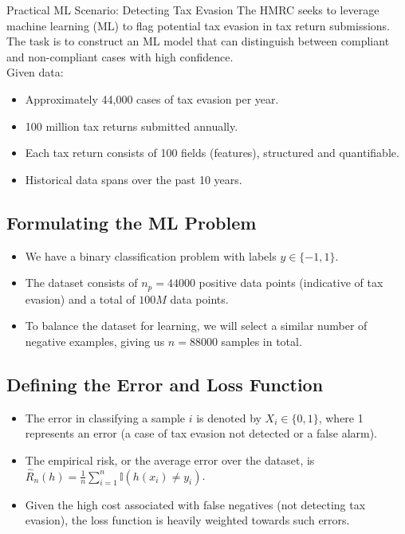 \begin{examplebox}{Practical ML Scenario: Detecting Tax Evasion}
    The HMRC seeks to leverage machine learning (ML) to flag potential tax evasion in tax return submissions. The task is to construct an ML model that can distinguish between compliant and non-compliant cases with high confidence.\\

Given data:
\begin{itemize}
    \item Approximately 44,000 cases of tax evasion per year.
    \item 100 million tax returns submitted annually.
    \item Each tax return consists of 100 fields (features), structured and quantifiable.
    \item Historical data spans over the past 10 years.
\end{itemize}

\subsection*{Formulating the ML Problem}
\begin{itemize}
    \item We have a binary classification problem with labels $y \in \{-1,1\}$.
    \item The dataset consists of $n_p = 44000$ positive data points (indicative of tax evasion) and a total of $100M$ data points.
    \item To balance the dataset for learning, we will select a similar number of negative examples, giving us $n = 88000$ samples in total.
\end{itemize}

\subsection*{Defining the Error and Loss Function}
\begin{itemize}
    \item The error in classifying a sample $i$ is denoted by $X_i \in \{0,1\}$, where 1 represents an error (a case of tax evasion not detected or a false alarm).
    \item The empirical risk, or the average error over the dataset, is $\widehat{R}_n(h) = \frac{1}{n} \sum_{i=1}^{n} \mathbb{I}(h(x_i) \neq y_i)$.
    \item Given the high cost associated with false negatives (not detecting tax evasion), the loss function is heavily weighted towards such errors.
\end{itemize}


\end{examplebox}
